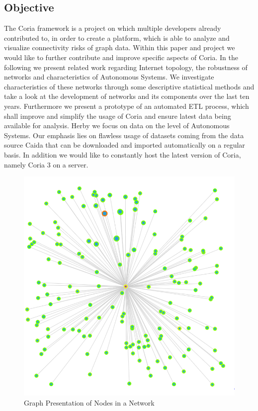 \documentclass[conference, 11pt]{IEEEtran}
\begin{document}
\vspace{1cm}

   


 


\subsection{Objective}
The Coria framework is a project on which multiple developers already contributed to, in order to create a platform, which is able to analyze and visualize connectivity risks of graph data\cite{CoriaPaper}. Within this paper and project we would like to further contribute and improve specific aspects of Coria. In the following we present related work regarding Internet topology, the robustness of networks and characteristics of Autonomous Systems. We investigate characteristics of these networks through some descriptive statistical methods and take a look at the development of networks and its components over the last ten years. Furthermore we present a prototype of an automated ETL process, which shall improve and simplify the usage of Coria and ensure latest data being available for analysis. Herby we focus on data on the level of Autonomous Systems. Our emphasis lies on flawless usage of datasets coming from the data source Caida that can be downloaded and imported automatically on a regular basis. In addition we would like to constantly host the latest version of Coria, namely Coria 3 on a server. \\


\vspace{0.5cm}
\begin{figure}[htbp]
\centerline{\includegraphics[scale=0.2]{Graphics/nodePresentaion.PNG}}
\caption{Graph Presentation of Nodes in a Network}
\label{fig}
\end{figure}
\vspace{0.5cm}
\end{document}
